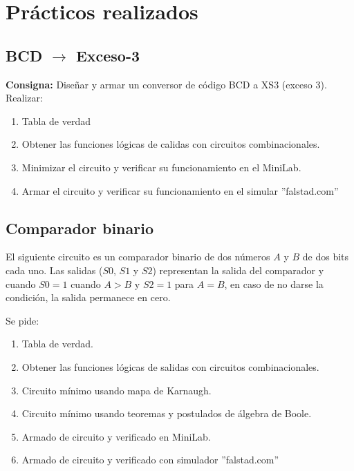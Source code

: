\section{Prácticos realizados}
\subsection{BCD $\rightarrow$ Exceso-3}
\textbf{Consigna:}
Diseñar y armar un conversor de código BCD a XS3 (exceso 3). Realizar: \begin{enumerate} \item Tabla de verdad \item Obtener las funciones lógicas de calidas con circuitos combinacionales. \item Minimizar el circuito y verificar su funcionamiento en el MiniLab. \item Armar el circuito y verificar su funcionamiento en el simular ''falstad.com'' \end{enumerate}

\subsection{Comparador binario}

El siguiente circuito es un comparador binario de dos números $A$ y $B$ de dos bits cada uno. Las salidas ($S0$, $S1$ y $S2$) representan la salida del comparador y cuando $S0 = 1$ cuando $A>B$ y $S2 = 1$ para $A = B$, en caso de no darse la condición, la salida permanece en cero.

\begin{center}
 \end{center}

Se pide:
\begin{enumerate} \item Tabla de verdad. \item Obtener las funciones lógicas de salidas con circuitos combinacionales. \item Circuito mínimo usando mapa de Karnaugh. \item Circuito mínimo usando teoremas y postulados de álgebra de Boole. \item Armado de circuito y verificado en MiniLab. \item Armado de circuito y verificado con simulador ''falstad.com'' \end{enumerate}
